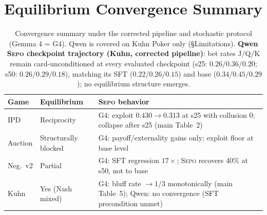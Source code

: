 \documentclass[letterpaper]{article} %
\newcommand{\sepo}{\textsc{Sepo}}
\begin{document}
\section{Equilibrium Convergence Summary}
\label{app:convergence}
\begin{table}[h]
\centering
\small
\begin{tabular}{@{}lp{2.6cm}p{2.8cm}@{}}
\toprule
\textbf{Game} & \textbf{Equilibrium} & \textbf{\sepo{} behavior} \\
\midrule
IPD           & Reciprocity         & G4: exploit $0.430 \to 0.313$ at s25 with collusion 0; collapse after s25 (main Table~2) \\
Auction       & Structurally blocked & G4: payoff/externality gains only; exploit floor at base level \\
Neg.\ v2      & Partial             & G4: SFT regression $17\times$; \sepo{} recovers $40\%$ at s50, not to base \\
Kuhn          & Yes (Nash mixed)    & G4: bluff rate $\to 1/3$ monotonically (main Table~5); Qwen: no convergence (SFT precondition unmet) \\
\bottomrule
\end{tabular}
\caption{Convergence summary under the corrected pipeline and stochastic protocol (Gemma 4 = G4). Qwen is covered on Kuhn Poker only (\S Limitations).
\textbf{Qwen \sepo{} checkpoint trajectory (Kuhn, corrected pipeline)}: bet rates J/Q/K remain card-unconditioned at every evaluated checkpoint (s25: $0.26/0.36/0.20$; s50: $0.26/0.29/0.18$), matching its SFT ($0.22/0.26/0.15$) and base ($0.34/0.45/0.29$); no equilibrium structure emerges.}
\label{tab:convergence}
\end{table}
\end{document}
